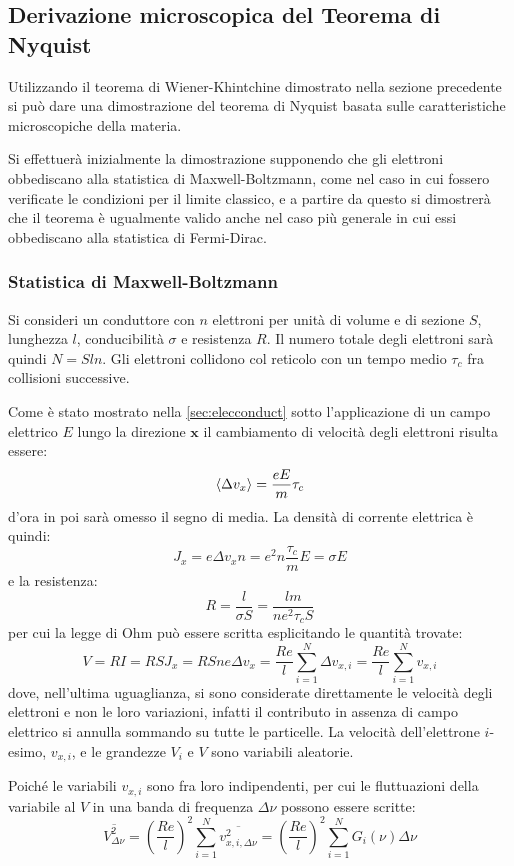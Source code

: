 \subsection{Derivazione microscopica del Teorema di Nyquist}

Utilizzando il teorema di Wiener-Khintchine dimostrato nella sezione precedente si può dare una dimostrazione del teorema di Nyquist basata sulle caratteristiche microscopiche della materia.

Si effettuerà inizialmente la dimostrazione supponendo che gli elettroni obbediscano alla statistica di Maxwell-Boltzmann, come nel caso in cui fossero verificate le condizioni per il limite classico, e a partire da questo si dimostrerà che il teorema è ugualmente valido anche nel caso più generale in cui essi obbediscano alla statistica di Fermi-Dirac.

\subsubsection{Statistica di Maxwell-Boltzmann}
Si consideri un conduttore con $ n $ elettroni per unità di volume e di sezione $ S $, lunghezza $ l $, conducibilità $ \sigma $ e resistenza $ R $. Il numero totale degli elettroni sarà quindi $ N = S l n $. Gli elettroni collidono col reticolo con un tempo medio $ \tau_c $ fra collisioni successive.

Come è stato mostrato nella \cref{sec:elecconduct} sotto l'applicazione di un campo elettrico $ E $ lungo la direzione $ \textbf{x} $ il cambiamento di velocità degli elettroni risulta essere:
\[ \expval{\Delta v_x} = \frac{e E}{m} \tau_c \]
d'ora in poi sarà omesso il segno di media.
La densità di corrente elettrica è quindi:
\[ J_x = e \Delta v_x n = e^2 n \frac{ \tau_c}{m} E = \sigma E\]
e la resistenza:
\[ R = \frac{l}{\sigma S} = \frac{lm}{n e^2 \tau_c S} \]
per cui la legge di Ohm può essere scritta esplicitando le quantità trovate:
\[ V = RI = R S J_x = R S n e \Delta v_x = \frac{R e}{l} \sum_{i=1}^{N} \Delta v_{x,i} = \frac{R e}{l} \sum_{i=1}^{N} v_{x,i} \] %
dove, nell'ultima uguaglianza, si sono considerate direttamente le velocità degli elettroni e non le loro variazioni, infatti il contributo in assenza di campo elettrico si annulla sommando su tutte le particelle. La velocità dell'elettrone $ i $-esimo, $ v_{x,i} $, e le grandezze $ V_i $ e $ V $ sono variabili aleatorie.

Poiché le variabili $ v_{x,i} $ sono fra loro indipendenti, per cui le fluttuazioni della variabile al $ V $ in una banda di frequenza $ \Delta \nu $ possono essere scritte:
\[ \overline{V_{\Delta \nu}^2} = \left(\frac{R e}{l}\right)^2 \sum_{i=1}^{N} \overline{v_{x,i,\Delta \nu}^2} = \left(\frac{R e}{l}\right)^2 \sum_{i=1}^{N} G_i(\nu) \Delta \nu\]

